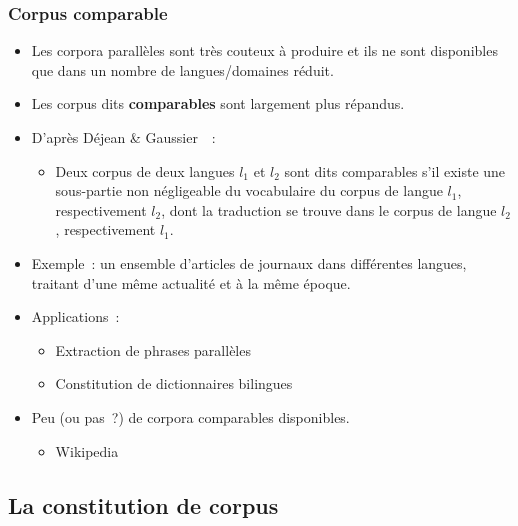 \begin{frame}[allowframebreaks]
\frametitle{Corpus comparable}

\begin{itemize}\itemsep10pt
    \item Les corpora parallèles sont très couteux à produire et ils ne sont
          disponibles que dans un nombre de langues/domaines réduit.
    \item Les corpus dits \textbf{comparables} sont largement plus répandus.
    \item D'après Déjean \& Gaussier~\cite{dejean2002nouvelle}~:
    \begin{itemize}
        \item Deux corpus de deux langues $l_1$ et $l_2$ sont dits comparables 
              s'il existe une sous-partie non négligeable du vocabulaire du 
              corpus de langue $l_1$, respectivement $l_2$, dont la traduction 
              se trouve dans le corpus de langue $l_2$, respectivement $l_1$.
    \end{itemize}

    \framebreak

    \item Exemple~: un ensemble d'articles de journaux dans différentes langues,
          traitant d'une même actualité et à la même époque.
    \item Applications~:
    \begin{itemize}
        \item Extraction de phrases parallèles~\cite{smith2010extracting}
        \item Constitution de dictionnaires bilingues~\cite{rapp1999automatic}
    \end{itemize}
    \item Peu (ou pas~?) de corpora comparables disponibles.
    \begin{itemize}
        \item Wikipedia
    \end{itemize}
\end{itemize}

\end{frame}


\subsection{La constitution de corpus}


